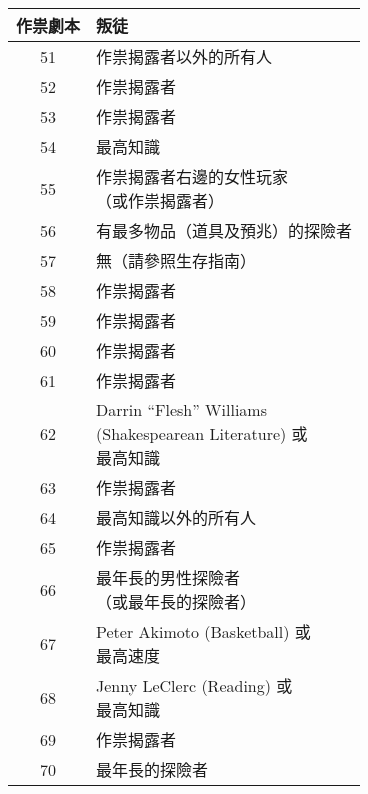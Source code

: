 \begin{center}
  \begin{minipage}[t]{.45\textwidth}
    \renewcommand{\arraystretch}{1.5}
    \begin{tabular}[t]{ c l }
      \toprule
        \bfseries 作祟劇本 & \bfseries 叛徒 \\[.5ex]
      \midrule
        51 & 作祟揭露者以外的所有人 \\
        52 & 作祟揭露者 \\
        53 & 作祟揭露者 \\
        54 & 最高知識 \\
        55 & \makecell[tl]{作祟揭露者右邊的女性玩家 \\ （或作祟揭露者）} \\

        56 & 有最多物品（道具及預兆）的探險者 \\
        57 & 無（請參照生存指南）\\
        58 & 作祟揭露者 \\
        59 & 作祟揭露者 \\
        60 & 作祟揭露者 \\

        61 & 作祟揭露者 \\
        62 & \makecell[tl]{Darrin ``Flesh'' Williams \\ (Shakespearean Literature) 或 \\ 最高知識 } \\
        63 & 作祟揭露者 \\
        64 & 最高知識以外的所有人 \\
        65 & 作祟揭露者 \\

        66 & \makecell[tl]{最年長的男性探險者 \\ （或最年長的探險者）} \\
        67 & \makecell[tl]{Peter Akimoto (Basketball) 或 \\ 最高速度 } \\
        68 & \makecell[tl]{Jenny LeClerc (Reading) 或 \\ 最高知識 } \\
        69 & 作祟揭露者 \\
        70 & 最年長的探險者 \\


\end{tabular}
\end{minipage}
\end{center}
